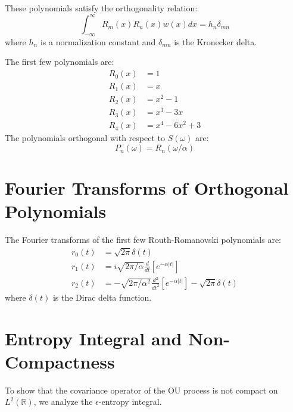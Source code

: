 \documentclass{article}
\begin{document}
These polynomials satisfy the orthogonality relation:
\begin{equation}
  \int_{- \infty}^{\infty} R_m (x) R_n (x) w (x) dx = h_n \delta_{mn}
\end{equation}
where $h_n$ is a normalization constant and $\delta_{mn}$ is the Kronecker
delta.

The first few polynomials are:
\begin{equation}
  \begin{array}{ll}
    R_0 (x) & = 1\\
    R_1 (x) & = x\\
    R_2 (x) & = x^2 - 1\\
    R_3 (x) & = x^3 - 3 x\\
    R_4 (x) & = x^4 - 6 x^2 + 3
  \end{array}
\end{equation}
The polynomials orthogonal with respect to $S (\omega)$ are:
\begin{equation}
  P_n (\omega) = R_n  (\omega / \alpha)
\end{equation}

\section{Fourier Transforms of Orthogonal Polynomials}

The Fourier transforms of the first few Routh-Romanovski polynomials are:
\begin{equation}
  \begin{array}{ll}
    r_0 (t) & = \sqrt{2 \pi} \delta (t)\\
    r_1 (t) & = i \sqrt{2 \pi / \alpha}  \frac{d}{dt} [e^{- \alpha |t|}]\\
    r_2 (t) & = - \sqrt{2 \pi / \alpha^2}  \frac{d^2}{dt^2} [e^{- \alpha |t|}]
    - \sqrt{2 \pi} \delta (t)
  \end{array}
\end{equation}
where $\delta (t)$ is the Dirac delta function.

\section{Entropy Integral and Non-Compactness}

To show that the covariance operator of the OU process is not compact on $L^2
(\mathbb{R})$, we analyze the $\epsilon$-entropy integral.
\end{document}
